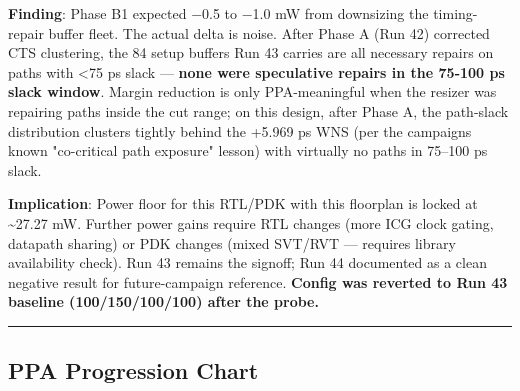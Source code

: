 \begin{record}
\textbf{Finding}: Phase B1 expected −0.5 to −1.0 mW from downsizing the
timing-repair buffer fleet. The actual delta is noise. After Phase A
(Run 42) corrected CTS clustering, the 84 setup buffers Run 43 carries
are all necessary repairs on paths with \textless75 ps slack ---
\textbf{none were speculative repairs in the 75-100 ps slack window}.
Margin reduction is only PPA-meaningful when the resizer was repairing
paths inside the cut range; on this design, after Phase A, the
path-slack distribution clusters tightly behind the +5.969 ps WNS (per
the campaign\textquotesingle s known "co-critical path exposure" lesson)
with virtually no paths in 75--100 ps slack.

\textbf{Implication}: Power floor for this RTL/PDK with this floorplan
is locked at \textasciitilde27.27 mW. Further power gains require RTL
changes (more ICG clock gating, datapath sharing) or PDK changes (mixed
SVT/RVT --- requires library availability check). Run 43 remains the
signoff; Run 44 documented as a clean negative result for
future-campaign reference. \textbf{Config was reverted to Run 43
baseline (100/\allowbreak{}150/\allowbreak{}100/\allowbreak{}100) after
the probe.}

\begin{center}\rule{0.5\linewidth}{0.5pt}\end{center}

\end{record}

\subsection{PPA Progression Chart}\label{cr:run:asap7-cpu:ppa-progression-chart}

